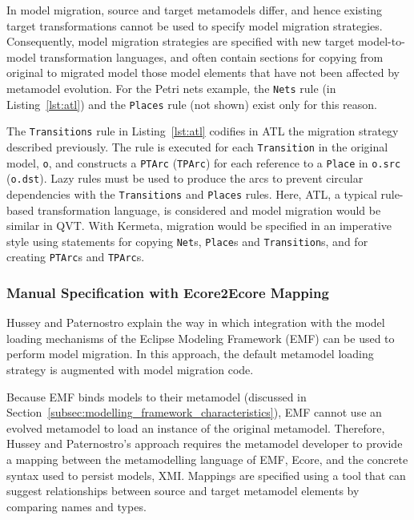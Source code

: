In model migration, source and target metamodels differ, and hence existing target transformations cannot be used to specify model migration strategies. Consequently, model migration strategies are specified with new target model-to-model transformation languages, and often contain sections for copying from original to migrated model those model elements that have not been affected by metamodel evolution. For the Petri nets example, the \texttt{Nets} rule (in Listing~\ref{lst:atl}) and the \texttt{Places} rule (not shown) exist only for this reason.

The \texttt{Transitions} rule in Listing~\ref{lst:atl} codifies in ATL the migration strategy described previously. The rule is executed for each \texttt{Transition} in the original model, \texttt{o}, and constructs a \texttt{PTArc} (\texttt{TPArc}) for each reference to a \texttt{Place} in \texttt{o.src} (\texttt{o.dst}). Lazy rules must be used to produce the arcs to prevent circular dependencies with the \texttt{Transitions} and \texttt{Places} rules. Here, ATL, a typical rule-based transformation language, is considered and model migration would be similar in QVT. With Kermeta, migration would be specified in an imperative style using statements for copying \texttt{Net}s, \texttt{Place}s and \texttt{Transition}s, and for creating \texttt{PTArc}s and \texttt{TPArc}s.


\subsubsection{Manual Specification with Ecore2Ecore Mapping}
\label{subsubsec:ecore2ecore}
Hussey and Paternostro \cite{hussey06advanced} explain the way in which integration with the model loading mechanisms of the Eclipse Modeling Framework (EMF) \cite{steinberg09emf} can be used to perform model migration. In this approach, the default metamodel loading strategy is augmented with model migration code.

Because EMF binds models to their metamodel (discussed in Section~\ref{subsec:modelling_framework_characteristics}), EMF cannot use an evolved metamodel to load an instance of the original metamodel. Therefore, Hussey and Paternostro's approach requires the metamodel developer to provide a mapping between the metamodelling language of EMF, Ecore, and the concrete syntax used to persist models, XMI. Mappings are specified using a tool that can suggest relationships between source and target metamodel elements by comparing names and types.

